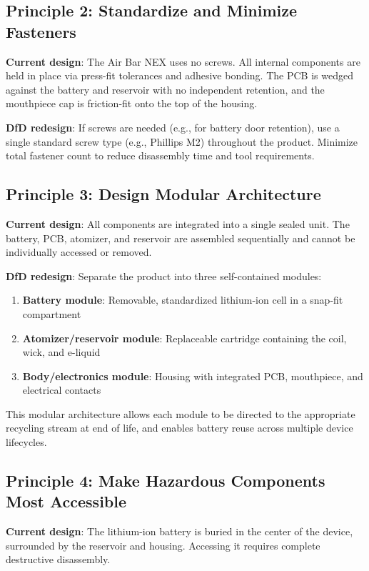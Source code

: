 \subsection{Principle 2: Standardize and Minimize Fasteners}

\textbf{Current design}: The Air Bar NEX uses no screws. All internal components are held in place via press-fit tolerances and adhesive bonding. The PCB is wedged against the battery and reservoir with no independent retention, and the mouthpiece cap is friction-fit onto the top of the housing.

\textbf{DfD redesign}: If screws are needed (e.g., for battery door retention), use a single standard screw type (e.g., Phillips M2) throughout the product. Minimize total fastener count to reduce disassembly time and tool requirements.

\subsection{Principle 3: Design Modular Architecture}

\textbf{Current design}: All components are integrated into a single sealed unit. The battery, PCB, atomizer, and reservoir are assembled sequentially and cannot be individually accessed or removed.

\textbf{DfD redesign}: Separate the product into three self-contained modules:
\begin{enumerate}
    \item \textbf{Battery module}: Removable, standardized lithium-ion cell in a snap-fit compartment
    \item \textbf{Atomizer/reservoir module}: Replaceable cartridge containing the coil, wick, and e-liquid
    \item \textbf{Body/electronics module}: Housing with integrated PCB, mouthpiece, and electrical contacts
\end{enumerate}

This modular architecture allows each module to be directed to the appropriate recycling stream at end of life, and enables battery reuse across multiple device lifecycles.

\subsection{Principle 4: Make Hazardous Components Most Accessible}

\textbf{Current design}: The lithium-ion battery is buried in the center of the device, surrounded by the reservoir and housing. Accessing it requires complete destructive disassembly.

